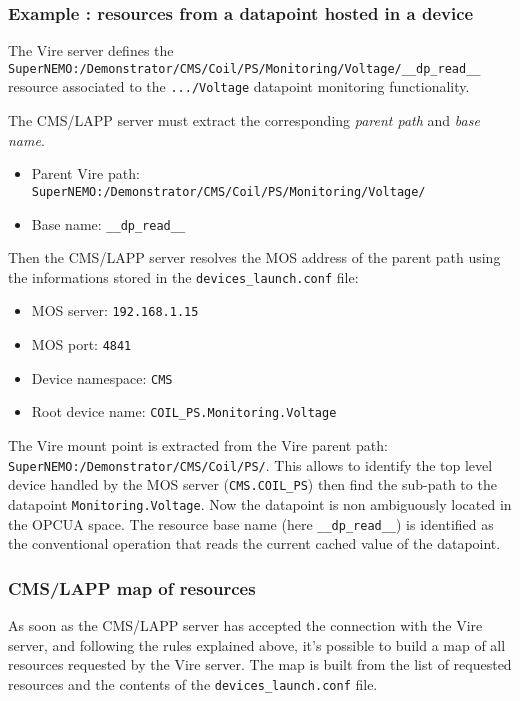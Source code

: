 \subsubsection{Example : resources from a datapoint hosted in a device}


The            Vire            server           defines            the
\verb|SuperNEMO:/Demonstrator/CMS/Coil/PS/Monitoring/Voltage/__dp_read__|
resource associated  to the \texttt{.../Voltage}  datapoint monitoring
functionality.

The CMS/LAPP server must extract the corresponding  \emph{parent path} and \emph{base name}.

\begin{itemize}
\item Parent Vire path:  \verb|SuperNEMO:/Demonstrator/CMS/Coil/PS/Monitoring/Voltage/|
\item Base name:  \verb|__dp_read__|
\end{itemize}


Then the CMS/LAPP server resolves the MOS address of the parent path using the informations
stored in the \verb|devices_launch.conf| file:
\begin{itemize}
\item MOS server: \texttt{192.168.1.15}
\item MOS port: \texttt{4841}
\item Device namespace: \texttt{CMS}
\item Root device name: \texttt{COIL\_PS.Monitoring.Voltage}
\end{itemize}

The  Vire  mount  point  is  extracted  from  the  Vire  parent  path:
\verb|SuperNEMO:/Demonstrator/CMS/Coil/PS/|.  This allows to identify
the top level device handled by the MOS server (\texttt{CMS.COIL\_PS})
then find the sub-path  to the datapoint \texttt{Monitoring.Voltage}.
Now the datapoint  is non ambiguously located in the  OPCUA space. The
resource base name (here \verb|__dp_read__|)  is identified as the
conventional  operation that  reads the  current cached  value of  the
datapoint.

\subsubsection{CMS/LAPP map of resources}

As soon  as the CMS/LAPP server  has accepted the connection  with the Vire
server,  and following  the rules  explained above,  it's possible  to
build a map of all resources requested by the Vire server.  The map is
built from  the list of  requested resources  and the contents  of the
\texttt{devices\_launch.conf} file.

